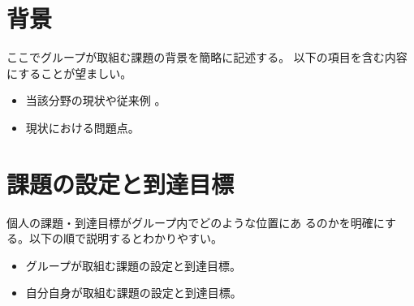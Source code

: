 \documentclass[twocolumn]{jsarticle}
\begin{document}
\fontsize{10}{18}\selectfont

%


\section{背景}
\begin{hissu}
ここでグループが取組む課題の背景を簡略に記述する。
以下の項目を含む内容にすることが望ましい。
\begin{itemize}
 \item 当該分野の現状や従来例 。
 \item 現状における問題点。
\end{itemize}
\end{hissu}

\section{課題の設定と到達目標}
\begin{hissu}
個人の課題・到達目標がグループ内でどのような位置にあ
るのかを明確にする。以下の順で説明するとわかりやすい。
\begin{itemize}
 \item グループが取組む課題の設定と到達目標。
 \item 自分自身が取組む課題の設定と到達目標。
\end{itemize}
\end{hissu}
\end{document}
